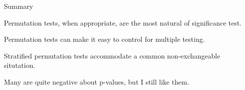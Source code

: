 \documentclass[aspectratio=169,12pt,t]{beamer}
\begin{document}
\begin{frame}[c]{}
\end{frame}



\begin{frame}{Summary}

  \bbi
\item Permutation tests, when appropriate, are the most natural
  of significance test.
\item Permutation tests can make it easy to control for multiple
  testing.
\item Stratified permutation tests accommodate a common
  non-exchangeable situtation.
\item Many are quite negative about p-values, but I still like them.
  \ei

\end{frame}
\end{document}
